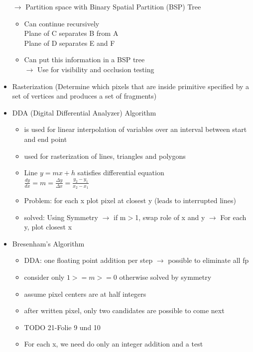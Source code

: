 \documentclass[11pt,a4paper]{article}
\begin{document}
\begin{itemize}
			\item[$\rightarrow$] Partition space with Binary Spatial Partition (BSP) Tree
				\begin{itemize}
					\item Can continue recursively\\
					Plane of C separates B from A\\
					Plane of D separates E and F
					\item Can put this information in a BSP tree\\
					$\rightarrow$ Use for visibility and occlusion testing
				\end{itemize}
			\item Rasterization (Determine which pixels that are inside primitive specified by a set of vertices and produces a set of fragments)
			\item DDA (Digital Differential Analyzer) Algorithm
				\begin{itemize}
					\item is used for linear interpolation of variables over an interval between start and end point
					\item used for rasterization of lines, triangles and polygons
					\item Line $y=mx+h$ satisfies differential equation\\
					$\frac{dy}{dx}=m=\frac{\Delta y}{\Delta x}=\frac{y_2-y_1}{x_2-x_1}$
					\item Problem: for each x plot pixel at closest y (leads to interrupted lines)
					\item solved: Using Symmetry $\rightarrow$ if m$>$1, swap role of x and y $\rightarrow$ For each y, plot closest x
				\end{itemize}
			\item Bresenham’s Algorithm
				\begin{itemize}
					\item DDA: one floating point addition per step $\rightarrow$ possible to eliminate all fp
					\item consider only $1>=m>=0$ otherwise solved by symmetry
					\item assume pixel centers are at half integers
					\item after written pixel, only two candidates are possible to come next
					\item TODO 21-Folie 9 und 10
					\item For each x, we need do only an integer addition and a test\\

\end{itemize}
\end{itemize}
\end{document}
